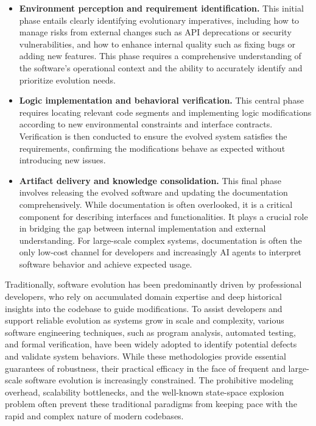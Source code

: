\begin{itemize}
    \item \textbf{Environment perception and requirement identification.} This initial phase entails clearly identifying evolutionary imperatives, including how to manage risks from external changes such as API deprecations or security vulnerabilities, and how to enhance internal quality such as fixing bugs or adding new features. This phase requires a comprehensive understanding of the software's operational context and the ability to accurately identify and prioritize evolution needs.
    \item \textbf{Logic implementation and behavioral verification.} This central phase requires locating relevant code segments and implementing logic modifications according to new environmental constraints and interface contracts. Verification is then conducted to ensure the evolved system satisfies the requirements, confirming the modifications behave as expected without introducing new issues.
    \item \textbf{Artifact delivery and knowledge consolidation.} This final phase involves releasing the evolved software and updating the documentation comprehensively. While documentation is often overlooked, it is a critical component for describing interfaces and functionalities. It plays a crucial role in bridging the gap between internal implementation and external understanding. For large-scale complex systems, documentation is often the only low-cost channel for developers and increasingly AI agents to interpret software behavior and achieve expected usage.
\end{itemize}

Traditionally, software evolution has been predominantly driven by professional developers, who rely on accumulated domain expertise and deep historical insights into the codebase to guide modifications. To assist developers and support reliable evolution as systems grow in scale and complexity, various software engineering techniques, such as program analysis, automated testing, and formal verification, have been widely adopted to identify potential defects and validate system behaviors. While these methodologies provide essential guarantees of robustness, their practical efficacy in the face of frequent and large-scale software evolution is increasingly constrained. The prohibitive modeling overhead, scalability bottlenecks, and the well-known state-space explosion problem often prevent these traditional paradigms from keeping pace with the rapid and complex nature of modern codebases. 

